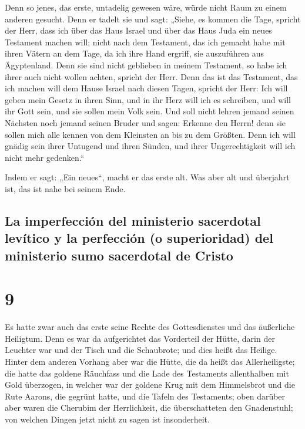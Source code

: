  Denn so jenes, das erste, untadelig gewesen wäre, würde
nicht Raum zu einem anderen gesucht.  Denn er tadelt sie
und sagt: „Siehe, es kommen die Tage, spricht der Herr, dass ich über
das Haus Israel und über das Haus Juda ein neues Testament machen will;
 nicht nach dem Testament, das ich gemacht habe mit ihren
Vätern an dem Tage, da ich ihre Hand ergriff, sie auszuführen aus
Ägyptenland. Denn sie sind nicht geblieben in meinem Testament, so habe
ich ihrer auch nicht wollen achten, spricht der Herr. 
Denn das ist das Testament, das ich machen will dem Hause Israel nach
diesen Tagen, spricht der Herr: Ich will geben mein Gesetz in ihren
Sinn, und in ihr Herz will ich es schreiben, und will ihr Gott sein, und
sie sollen mein Volk sein.  Und soll nicht lehren jemand
seinen Nächsten noch jemand seinen Bruder und sagen: Erkenne den Herrn!
denn sie sollen mich alle kennen von dem Kleinsten an bis zu dem
Größten.  Denn ich will gnädig sein ihrer Untugend und
ihren Sünden, und ihrer Ungerechtigkeit will ich nicht mehr gedenken.``

 Indem er sagt: „Ein neues``, macht er das erste alt. Was
aber alt und überjahrt ist, das ist nahe bei seinem Ende.

\hypertarget{la-imperfecciuxf3n-del-ministerio-sacerdotal-levuxedtico-y-la-perfecciuxf3n-o-superioridad-del-ministerio-sumo-sacerdotal-de-cristo}{%
\subsection{La imperfección del ministerio sacerdotal levítico y la
perfección (o superioridad) del ministerio sumo sacerdotal de
Cristo}\label{la-imperfecciuxf3n-del-ministerio-sacerdotal-levuxedtico-y-la-perfecciuxf3n-o-superioridad-del-ministerio-sumo-sacerdotal-de-cristo}}

\hypertarget{section-8}{%
\section{9}\label{section-8}}

 Es hatte zwar auch das erste seine Rechte des
Gottesdienstes und das äußerliche Heiligtum.  Denn es war
da aufgerichtet das Vorderteil der Hütte, darin der Leuchter war und der
Tisch und die Schaubrote; und dies heißt das Heilige. 
Hinter dem anderen Vorhang aber war die Hütte, die da heißt das
Allerheiligste;  die hatte das goldene Räuchfass und die
Lade des Testaments allenthalben mit Gold überzogen, in welcher war der
goldene Krug mit dem Himmelsbrot und die Rute Aarons, die gegrünt hatte,
und die Tafeln des Testaments;  oben darüber aber waren
die Cherubim der Herrlichkeit, die überschatteten den Gnadenstuhl; von
welchen Dingen jetzt nicht zu sagen ist insonderheit.


